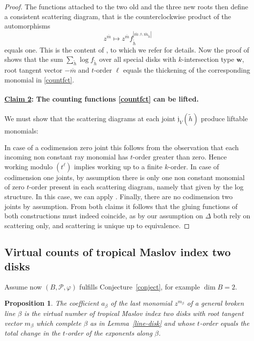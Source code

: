 \documentclass[11pt,letter]{amsart}
\newtheorem{proposition}[theorem]{Proposition}
\theoremstyle{definition}
\theoremstyle{remark}
\numberwithin{equation}{section}
\numberwithin{figure}{section}
\newcommand {\foj}  {\mathfrak{j}}
\renewcommand{\P}  {\mathscr{P}}
\begin{document}
\begin{proof}
The functions attached to the two old and the three new roots then define a
consistent scattering diagram, that is the counterclockwise product of the
automorphisms 
\[
z^{\overline m} \mapsto z^{\overline m}
f_{\tilde h}^{|\overline m \wedge \overline m_{\tilde h}|}
\]
equals one. This is the content of \cite[Lem.\,1.9]{gps}, to which we refer for
details. Now the proof of \cite[Thm.\,2.7]{gps} shows that the sum
$\sum_{\tilde h} \log f_{\tilde h}$ over all special disks with $k$-intersection
type $\mathbf w$, root tangent vector $-\overline m$ and $t$-order $\ell$ equals
the thickening of the corresponding monomial in \eqref{countfct}.

\paragraph{\underline{Claim 2}: The counting functions
\eqref{countfct} can be lifted.}

We must show that the scattering diagrams at each joint $\foj_V(\tilde h)$
produce liftable monomials:

In case of a codimension zero joint this follows from the observation that each
incoming non constant ray monomial has $t$-order greater than zero. Hence
working modulo $(t^\ell)$ implies working up to a finite $k$-order. In case of
codimension one joints, by assumption there is only one non constant monomial of
zero $t$-order present in each scattering diagram, namely that given by the log
structure. In this case, we can apply \cite{kansas}. Finally, there are no
codimension two joints by assumption. \smallskip From both claims it follows
that the gluing functions of both constructions must indeed coincide, as by our
assumption on $\Delta$ both rely on scattering only, and scattering is unique up
to equivalence.
\end{proof}


\subsection{Virtual counts of tropical Maslov index two disks}

Assume now $(B,\P,\varphi)$ fulfills Conjecture~\ref{conject}, for example $\dim
B=2$.

\begin{proposition}
\label{Prop: Virtual count}
The coefficient $a_\beta $ of the last monomial $z^{m_\beta}$ of a general
broken line $\beta$ is the virtual number of tropical Maslov index two disks
with root tangent vector $m_\beta$ which complete $\beta$ as in
Lemma~\ref{line-disk} and whose $t$-order equals the total change in the
$t$-order of the exponents along $\beta$.
\end{proposition}
\end{document}
